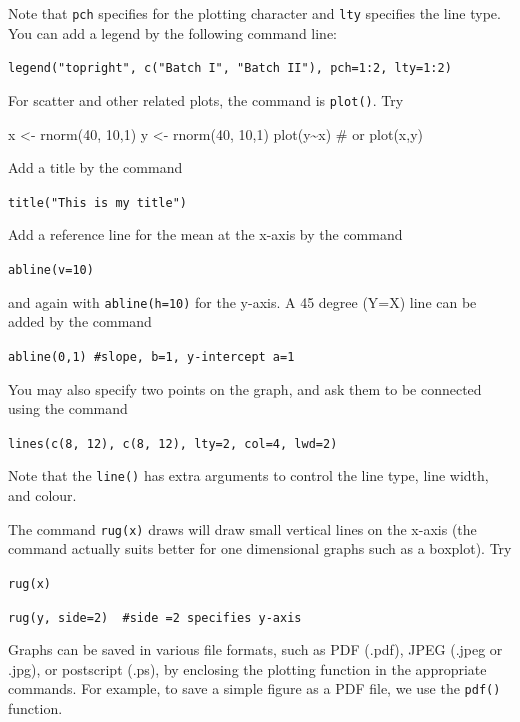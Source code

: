 \documentclass[
  letterpaper,
  DIV=11,
  numbers=noendperiod]{scrreprt}
\newenvironment{Shaded}{\begin{snugshade}}{\end{snugshade}}
\newcommand{\CommentTok}[1]{\textcolor[rgb]{0.37,0.37,0.37}{#1}}
\newcommand{\DecValTok}[1]{\textcolor[rgb]{0.68,0.00,0.00}{#1}}
\newcommand{\FunctionTok}[1]{\textcolor[rgb]{0.28,0.35,0.67}{#1}}
\newcommand{\NormalTok}[1]{\textcolor[rgb]{0.00,0.23,0.31}{#1}}
\newcommand{\OtherTok}[1]{\textcolor[rgb]{0.00,0.23,0.31}{#1}}
\newcommand{\SpecialCharTok}[1]{\textcolor[rgb]{0.37,0.37,0.37}{#1}}
\begin{document}
Note that \texttt{pch} specifies for the plotting character and
\texttt{lty} specifies the line type. You can add a legend by the
following command line:

\texttt{legend("topright",\ c("Batch\ I",\ "Batch\ II"),\ pch=1:2,\ lty=1:2)}

For scatter and other related plots, the command is \texttt{plot()}. Try

\begin{Shaded}
\begin{Highlighting}[]
\NormalTok{x  }\OtherTok{\textless{}{-}}  \FunctionTok{rnorm}\NormalTok{(}\DecValTok{40}\NormalTok{, }\DecValTok{10}\NormalTok{,}\DecValTok{1}\NormalTok{)}
\NormalTok{y  }\OtherTok{\textless{}{-}} \FunctionTok{rnorm}\NormalTok{(}\DecValTok{40}\NormalTok{, }\DecValTok{10}\NormalTok{,}\DecValTok{1}\NormalTok{)}
\FunctionTok{plot}\NormalTok{(y}\SpecialCharTok{\textasciitilde{}}\NormalTok{x)  }\CommentTok{\# or plot(x,y) }
\end{Highlighting}
\end{Shaded}

Add a title by the command

\texttt{title("This\ is\ my\ title")}

Add a reference line for the mean at the x-axis by the command

\texttt{abline(v=10)}

and again with \texttt{abline(h=10)} for the y-axis. A 45 degree (Y=X)
line can be added by the command

\texttt{abline(0,1)\ \#slope,\ b=1,\ y-intercept\ a=1}

You may also specify two points on the graph, and ask them to be
connected using the command

\texttt{lines(c(8,\ 12),\ c(8,\ 12),\ lty=2,\ col=4,\ lwd=2)}

Note that the \texttt{line()} has extra arguments to control the line
type, line width, and colour.

The command \texttt{rug(x)} draws will draw small vertical lines on the
x-axis (the command actually suits better for one dimensional graphs
such as a boxplot). Try

\texttt{rug(x)}

\texttt{rug(y,\ side=2)\ \ \#side\ =2\ specifies\ y-axis}

Graphs can be saved in various file formats, such as PDF (.pdf), JPEG
(.jpeg or .jpg), or postscript (.ps), by enclosing the plotting function
in the appropriate commands. For example, to save a simple figure as a
PDF file, we use the \texttt{pdf()} function.
\end{document}
